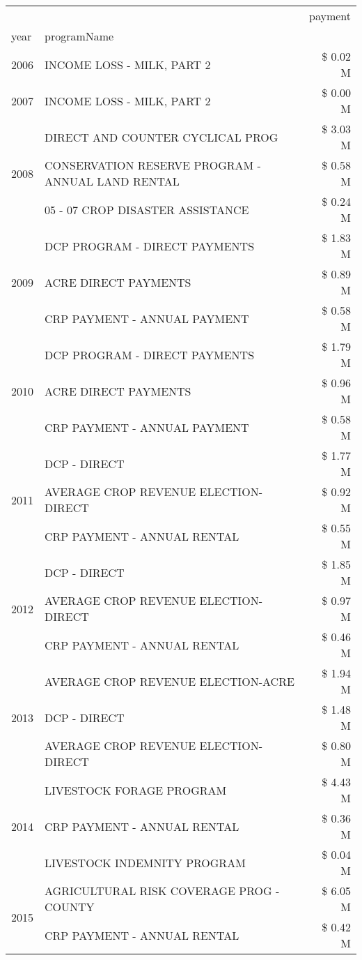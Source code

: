 \begin{tabular}{llr}
\toprule
 &  & payment \\
year & programName &  \\
\midrule
2006 & INCOME LOSS - MILK, PART 2 & \$ 0.02 M \\
\cline{1-3}
2007 & INCOME LOSS - MILK, PART 2 & \$ 0.00 M \\
\cline{1-3}
\multirow[t]{3}{*}{2008} & DIRECT AND COUNTER CYCLICAL PROG & \$ 3.03 M \\
 & CONSERVATION RESERVE PROGRAM - ANNUAL LAND RENTAL & \$ 0.58 M \\
 & 05 - 07 CROP DISASTER ASSISTANCE & \$ 0.24 M \\
\cline{1-3}
\multirow[t]{3}{*}{2009} & DCP PROGRAM - DIRECT PAYMENTS & \$ 1.83 M \\
 & ACRE DIRECT PAYMENTS & \$ 0.89 M \\
 & CRP PAYMENT - ANNUAL PAYMENT & \$ 0.58 M \\
\cline{1-3}
\multirow[t]{3}{*}{2010} & DCP PROGRAM - DIRECT PAYMENTS & \$ 1.79 M \\
 & ACRE DIRECT PAYMENTS & \$ 0.96 M \\
 & CRP PAYMENT - ANNUAL PAYMENT & \$ 0.58 M \\
\cline{1-3}
\multirow[t]{3}{*}{2011} & DCP - DIRECT & \$ 1.77 M \\
 & AVERAGE CROP REVENUE ELECTION-DIRECT & \$ 0.92 M \\
 & CRP PAYMENT - ANNUAL RENTAL & \$ 0.55 M \\
\cline{1-3}
\multirow[t]{3}{*}{2012} & DCP - DIRECT & \$ 1.85 M \\
 & AVERAGE CROP REVENUE ELECTION-DIRECT & \$ 0.97 M \\
 & CRP PAYMENT - ANNUAL RENTAL & \$ 0.46 M \\
\cline{1-3}
\multirow[t]{3}{*}{2013} & AVERAGE CROP REVENUE ELECTION-ACRE & \$ 1.94 M \\
 & DCP - DIRECT & \$ 1.48 M \\
 & AVERAGE CROP REVENUE ELECTION-DIRECT & \$ 0.80 M \\
\cline{1-3}
\multirow[t]{3}{*}{2014} & LIVESTOCK FORAGE PROGRAM & \$ 4.43 M \\
 & CRP PAYMENT - ANNUAL RENTAL & \$ 0.36 M \\
 & LIVESTOCK INDEMNITY PROGRAM & \$ 0.04 M \\
\cline{1-3}
\multirow[t]{3}{*}{2015} & AGRICULTURAL RISK COVERAGE PROG - COUNTY & \$ 6.05 M \\
 & CRP PAYMENT - ANNUAL RENTAL & \$ 0.42 M \\

\end{tabular}
